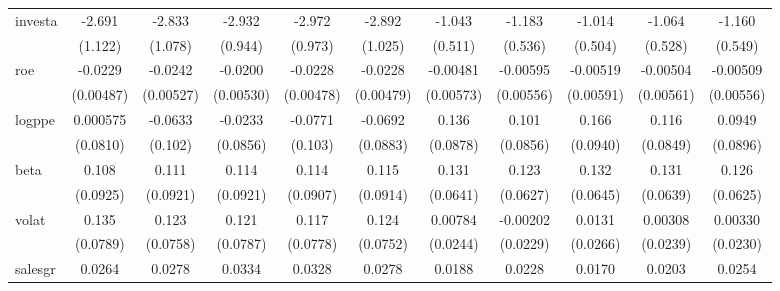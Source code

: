 \begin{table}[htbp]
\begin{tabular}{l*{10}{c}}
investa         &   -2.691\sym{**} &   -2.833\sym{**} &   -2.932\sym{***}&   -2.972\sym{***}&   -2.892\sym{***}&   -1.043\sym{**} &   -1.183\sym{**} &   -1.014\sym{**} &   -1.064\sym{**} &   -1.160\sym{**} \\
                &  (1.122)         &  (1.078)         &  (0.944)         &  (0.973)         &  (1.025)         &  (0.511)         &  (0.536)         &  (0.504)         &  (0.528)         &  (0.549)         \\
roe             &  -0.0229\sym{***}&  -0.0242\sym{***}&  -0.0200\sym{***}&  -0.0228\sym{***}&  -0.0228\sym{***}& -0.00481         & -0.00595         & -0.00519         & -0.00504         & -0.00509         \\
                &(0.00487)         &(0.00527)         &(0.00530)         &(0.00478)         &(0.00479)         &(0.00573)         &(0.00556)         &(0.00591)         &(0.00561)         &(0.00556)         \\
logppe          & 0.000575         &  -0.0633         &  -0.0233         &  -0.0771         &  -0.0692         &    0.136         &    0.101         &    0.166\sym{*}  &    0.116         &   0.0949         \\
                & (0.0810)         &  (0.102)         & (0.0856)         &  (0.103)         & (0.0883)         & (0.0878)         & (0.0856)         & (0.0940)         & (0.0849)         & (0.0896)         \\
beta            &    0.108         &    0.111         &    0.114         &    0.114         &    0.115         &    0.131\sym{**} &    0.123\sym{*}  &    0.132\sym{**} &    0.131\sym{**} &    0.126\sym{**} \\
                & (0.0925)         & (0.0921)         & (0.0921)         & (0.0907)         & (0.0914)         & (0.0641)         & (0.0627)         & (0.0645)         & (0.0639)         & (0.0625)         \\
volat           &    0.135\sym{*}  &    0.123         &    0.121         &    0.117         &    0.124         &  0.00784         & -0.00202         &   0.0131         &  0.00308         &  0.00330         \\
                & (0.0789)         & (0.0758)         & (0.0787)         & (0.0778)         & (0.0752)         & (0.0244)         & (0.0229)         & (0.0266)         & (0.0239)         & (0.0230)         \\
salesgr         &   0.0264         &   0.0278         &   0.0334         &   0.0328         &   0.0278         &   0.0188         &   0.0228         &   0.0170         &   0.0203         &   0.0254         \\

\end{tabular}
\end{table}
